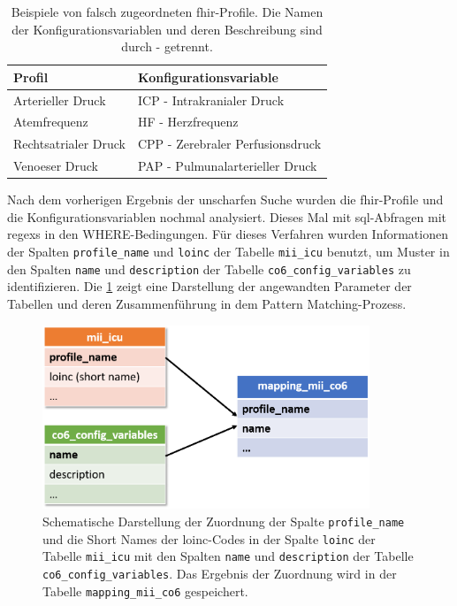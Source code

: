\begin{table}[ht]
	\centering 
	\caption[Beispiele von falsch zugeordneten \acs{fhir}-Profile]{Beispiele von falsch zugeordneten \acs{fhir}-Profile. Die Namen der Konfigurationsvariablen und deren Beschreibung sind durch \glqq-\grqq{} getrennt.}
	\label{tab:wrongpaar}
	\begin{tabular}{|l|l|}
		\hline
		\bfseries Profil & \bfseries Konfigurationsvariable \\ \hline
		Arterieller Druck & ICP - Intrakranialer Druck \\ \hline
		Atemfrequenz & HF - Herzfrequenz \\ \hline
        Rechtsatrialer Druck & CPP - Zerebraler Perfusionsdruck \\ \hline
        Venoeser Druck & PAP - Pulmunalarterieller Druck \\ \hline
	\end{tabular}
\end{table}

Nach dem vorherigen Ergebnis der unscharfen Suche wurden die \ac{fhir}-Profile und die Konfigurationsvariablen nochmal analysiert. Dieses Mal mit \ac{sql}-Abfragen mit \acp{regex} in den WHERE-Bedingungen. Für dieses Verfahren wurden Informationen der Spalten \texttt{profile\_name} und \texttt{loinc} der Tabelle \texttt{mii\_icu} benutzt, um Muster in den Spalten \texttt{name} und \texttt{description} der Tabelle \texttt{co6\_config\_variables} zu identifizieren. Die \ref{fig:mapping} zeigt eine Darstellung der angewandten Parameter der Tabellen und deren Zusammenführung in dem Pattern Matching-Prozess.

\clearpage

\begin{figure}[ht]
	\centering
	\includegraphics[height=5.5cm]{figures/mapping}
	\caption[Zuordnung der Konfigurationsvariablen mit den \acs{fhir}-Profilen]{Schematische Darstellung der Zuordnung der Spalte \texttt{profile\_name} und die Short Names der \acs{loinc}-Codes in der Spalte \texttt{loinc} der Tabelle \texttt{mii\_icu} mit den Spalten \texttt{name} und \texttt{description} der Tabelle \texttt{co6\_config\_variables}. Das Ergebnis der Zuordnung wird in der Tabelle \texttt{mapping\_mii\_co6} gespeichert.}
	\label{fig:mapping}
\end{figure}

